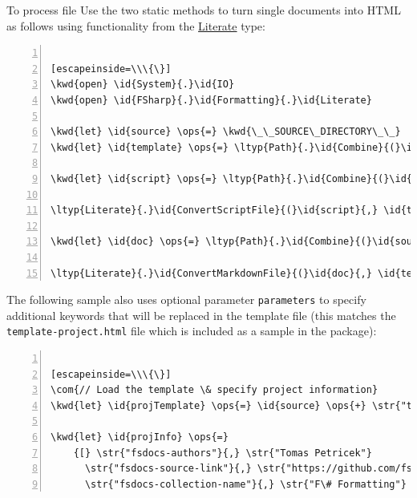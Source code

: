 \documentclass{article}
\newcommand{\id}[1]{\textcolor{black}{#1}}
\newcommand{\com}[1]{\textcolor{officegreen}{#1}}
\newcommand{\kwd}[1]{\textcolor{navy}{#1}}
\newcommand{\ops}[1]{\textcolor{purple}{#1}}
\newcommand{\str}[1]{\textcolor{olive}{#1}}
\begin{document}
To process file Use the two static methods to turn single documents into HTML
as follows using functionality from the \href{https://fsprojects.github.io/FSharp.Formatting/reference/fsharp-formatting-literate-literate.html}{Literate} type:
\begin{lstlisting}[numbers=left]

[escapeinside=\\\{\}]
\kwd{open} \id{System}{.}\id{IO}
\kwd{open} \id{FSharp}{.}\id{Formatting}{.}\id{Literate}

\kwd{let} \id{source} \ops{=} \kwd{\_\_SOURCE\_DIRECTORY\_\_}
\kwd{let} \id{template} \ops{=} \ltyp{Path}{.}\id{Combine}{(}\id{source}{,} \str{"template.html"}{)}

\kwd{let} \id{script} \ops{=} \ltyp{Path}{.}\id{Combine}{(}\id{source}{,} \str{"../docs/script.fsx"}{)}

\ltyp{Literate}{.}\id{ConvertScriptFile}{(}\id{script}{,} \id{template}{)}

\kwd{let} \id{doc} \ops{=} \ltyp{Path}{.}\id{Combine}{(}\id{source}{,} \str{"../docs/document.md"}{)}

\ltyp{Literate}{.}\id{ConvertMarkdownFile}{(}\id{doc}{,} \id{template}{)}

\end{lstlisting}



The following sample also uses optional parameter \texttt{parameters} to specify additional
keywords that will be replaced in the template file (this matches the \texttt{template-project.html}
file which is included as a sample in the package):
\begin{lstlisting}[numbers=left]

[escapeinside=\\\{\}]
\com{// Load the template \& specify project information}
\kwd{let} \id{projTemplate} \ops{=} \id{source} \ops{+} \str{"template-project.html"}

\kwd{let} \id{projInfo} \ops{=}
    {[} \str{"fsdocs-authors"}{,} \str{"Tomas Petricek"}
      \str{"fsdocs-source-link"}{,} \str{"https://github.com/fsprojects/FSharp.Formatting"}
      \str{"fsdocs-collection-name"}{,} \str{"F\# Formatting"} {]}

\end{lstlisting}
\end{document}
